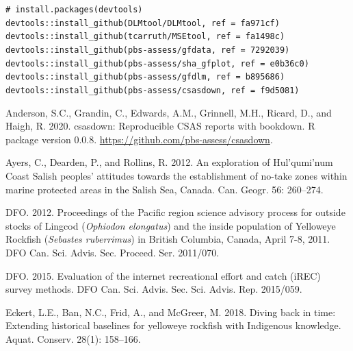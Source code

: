 \documentclass[11pt]{book}
\begin{document}
\texttt{\#\ install.packages(\textquotesingle{}devtools\textquotesingle{})}\\
\texttt{devtools::install\_github(\textquotesingle{}DLMtool/DLMtool\textquotesingle{},\ ref\ =\ \textquotesingle{}fa971cf\textquotesingle{})}~\\
\texttt{devtools::install\_github(\textquotesingle{}tcarruth/MSEtool\textquotesingle{},\ ref\ =\ \textquotesingle{}fa1498c\textquotesingle{})}~\\
\texttt{devtools::install\_github(\textquotesingle{}pbs-assess/gfdata\textquotesingle{},\ ref\ =\ \textquotesingle{}7292039\textquotesingle{})}~\\
\texttt{devtools::install\_github(\textquotesingle{}pbs-assess/sha\_gfplot\textquotesingle{},\ ref\ =\ \textquotesingle{}e0b36c0\textquotesingle{})}~\\
\texttt{devtools::install\_github(\textquotesingle{}pbs-assess/gfdlm\textquotesingle{},\ ref\ =\ \textquotesingle{}b895686\textquotesingle{})}~\\
\texttt{devtools::install\_github(\textquotesingle{}pbs-assess/csasdown\textquotesingle{},\ ref\ =\ \textquotesingle{}f9d5081\textquotesingle{})}~\\

\clearpage

\hypertarget{refs}{}
\leavevmode\hypertarget{ref-csasdown}{}%
Anderson, S.C., Grandin, C., Edwards, A.M., Grinnell, M.H., Ricard, D., and Haigh, R. 2020. csasdown: Reproducible CSAS reports with bookdown. R package version 0.0.8. \url{https://github.com/pbs-assess/csasdown}.

\leavevmode\hypertarget{ref-ayers2012}{}%
Ayers, C., Dearden, P., and Rollins, R. 2012. An exploration of Hul'qumi'num Coast Salish peoples' attitudes towards the establishment of no-take zones within marine protected areas in the Salish Sea, Canada. Can. Geogr. 56: 260--274.

\leavevmode\hypertarget{ref-dfo2012b}{}%
DFO. 2012. Proceedings of the Pacific region science advisory process for outside stocks of Lingcod (\emph{Ophiodon elongatus}) and the inside population of Yelloweye Rockfish (\emph{Sebastes ruberrimus}) in British Columbia, Canada, April 7-8, 2011. DFO Can. Sci. Advis. Sec. Proceed. Ser. 2011/070.

\leavevmode\hypertarget{ref-dfo2015}{}%
DFO. 2015. Evaluation of the internet recreational effort and catch (iREC) survey methods. DFO Can. Sci. Advis. Sec. Sci. Advis. Rep. 2015/059.

\leavevmode\hypertarget{ref-eckert2018}{}%
Eckert, L.E., Ban, N.C., Frid, A., and McGreer, M. 2018. Diving back in time: Extending historical baselines for yelloweye rockfish with Indigenous knowledge. Aquat. Conserv. 28(1): 158--166.
\end{document}
